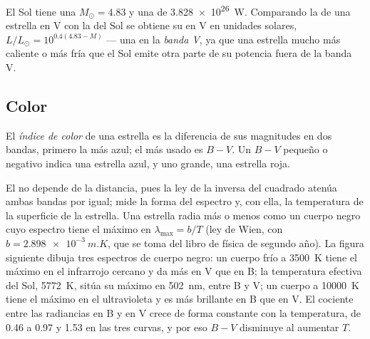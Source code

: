 El Sol tiene una  $M_\odot = 4.83$ y una  de
\qty{3.828e26}{W}. Comparando la  de una estrella en V con la del Sol
se obtiene su  en V en unidades solares,
$L/L_\odot = 10^{0.4(4.83 - M)}$ --- una  en la \emph{banda V}, ya que una
estrella mucho más caliente o más fría que el Sol emite otra parte de su potencia fuera
de la banda V.

\subsection*{Color}

\begin{definition}\label{def:b1:observing-the-sky:colour-index}
El \emph{índice de color} de una estrella es la diferencia de sus
magnitudes en dos bandas, primero la más azul; el más usado es $B - V$. Un $B - V$ pequeño
o negativo indica una estrella azul, y uno grande, una estrella roja.
\end{definition}

El  no depende de la distancia, pues la ley de la inversa del cuadrado
atenúa ambas bandas por igual; mide la forma del espectro y, con ella, la temperatura de
la superficie de la estrella. Una estrella radia más o menos como un cuerpo negro cuyo
espectro tiene el máximo en $\lambda_\mathrm{max} = b/T$ (ley de Wien, con
$b = \qty{2.898e-3}{m.K}$, que se toma del libro de física de segundo año).
La figura siguiente dibuja tres espectros de cuerpo negro: un cuerpo frío a
\qty{3500}{K} tiene el máximo en el infrarrojo cercano y da más  en V que en B; la
temperatura efectiva del Sol, \qty{5772}{K}, sitúa su máximo en \qty{502}{nm}, entre B y
V; un cuerpo a \qty{10000}{K} tiene el máximo en el ultravioleta y es más brillante en B
que en V. El cociente entre las radiancias en B y en V crece de forma constante con la
temperatura, de \num{0.46} a \num{0.97} y \num{1.53} en las tres curvas, y por eso
$B - V$ disminuye al aumentar $T$.

